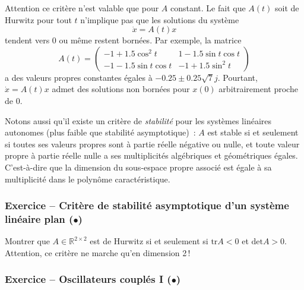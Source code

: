 \begin{preuve}
Attention ce critère n'est valable que pour \(A\) constant. Le fait que
\(A(t)\) soit de Hurwitz pour tout \(t\) n'implique pas que les
solutions du système \[
\dot{x} = A(t) x 
\] tendent vers 0 ou même restent bornées. Par exemple, la matrice \[
A(t) = \left( \begin{matrix} 
-1+1.5\cos^2t & 1-1.5\sin t \cos t \\
-1-1.5 \sin t \cos t & -1+1.5\sin^2 t
\end{matrix}
\right)
\] a des valeurs propres constantes égales à \(-0.25\pm 0.25\sqrt{7}j\).
Pourtant, \(\dot{x} = A(t) x\) admet des solutions non bornées pour
\(x(0)\) arbitrairement proche de 0.
\end{preuve}

\hypertarget{rem-crit_stabLin}{}
\begin{remarque}\label{rem-crit_stabLin}
Notons aussi qu'il existe un critère de \emph{stabilité} pour les
systèmes linéaires autonomes (plus faible que stabilité asymptotique)~:
\(A\) est stable si et seulement si toutes ses valeurs propres sont à
partie réelle négative ou nulle, et toute valeur propre à partie réelle
nulle a ses multiplicités algébriques et géométriques égales.
C'est-à-dire que la dimension du sous-espace propre associé est égale à
sa multiplicité dans le polynôme caractéristique.
\end{remarque}

\hypertarget{crit_stab_dim2}{%
\subsubsection*{\texorpdfstring{Exercice -- Critère de stabilité
asymptotique d'un système linéaire plan
(\(\mathord{\bullet}\))}{Exercice -- Critère de stabilité asymptotique d'un système linéaire plan (•)}}\label{crit_stab_dim2}}


Montrer que \(A\in \mathbb{R}^{2\times 2}\) est de Hurwitz si et
seulement si \(\text{tr} A <0\) et \(\text{det} A >0\). Attention, ce
critère ne marche qu'en dimension 2\,!

\hypertarget{ressort-1}{%
\subsubsection*{\texorpdfstring{Exercice -- Oscillateurs couplés I
(\(\mathord{\bullet}\))}{Exercice -- Oscillateurs couplés I (•)}}\label{ressort-1}}

